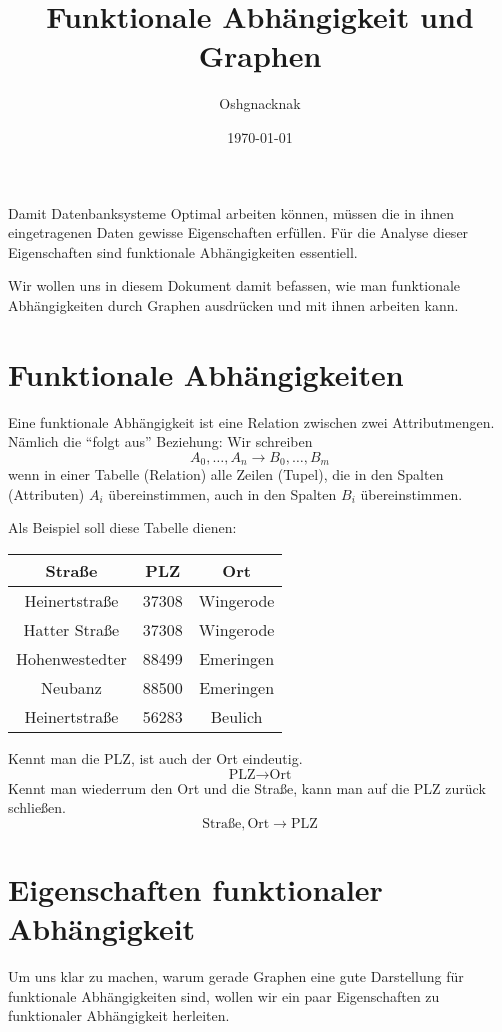 \documentclass[a4paper, ngerman]{article}
\title{Funktionale Abhängigkeit und Graphen}
\author{Oshgnacknak}
\date{\today}
\begin{document}
\maketitle

Damit Datenbanksysteme Optimal arbeiten können,
müssen die in ihnen eingetragenen Daten
gewisse Eigenschaften erfüllen.
Für die Analyse dieser Eigenschaften
sind funktionale Abhängigkeiten essentiell.

Wir wollen uns in diesem Dokument damit befassen,
wie man funktionale Abhängigkeiten durch Graphen ausdrücken
und mit ihnen arbeiten kann.

\section*{Funktionale Abhängigkeiten}
Eine funktionale Abhängigkeit
ist eine Relation zwischen zwei Attributmengen.
Nämlich die \enquote{folgt aus} Beziehung:
Wir schreiben
$$
    A_0, \dots, A_n \to 
    B_0, \dots, B_m
$$
wenn in einer Tabelle (Relation) alle Zeilen (Tupel),
die in den Spalten (Attributen) $A_i$ übereinstimmen,
auch in den Spalten $B_i$ übereinstimmen.

Als Beispiel soll diese Tabelle dienen:
\begin{center}
\begin{tabular}{ c | c | c }
    Straße & PLZ & Ort \\
    \hline
    Heinertstraße & 37308 & Wingerode \\
    Hatter Straße & 37308 & Wingerode \\
    Hohenwestedter & 88499 & Emeringen \\
    Neubanz & 88500 & Emeringen \\
    Heinertstraße & 56283 & Beulich \\
\end{tabular}
\end{center}
Kennt man die PLZ, ist auch der Ort eindeutig.
$$
    \text{PLZ} \to \text{Ort}
$$
Kennt man wiederrum den Ort und die Straße,
kann man auf die PLZ zurück schließen.
$$
    \text{Straße}, \text{Ort} \to \text{PLZ}
$$

\section*{Eigenschaften funktionaler Abhängigkeit}
Um uns klar zu machen,
warum gerade Graphen eine gute Darstellung für
funktionale Abhängigkeiten sind,
wollen wir ein paar Eigenschaften zu
funktionaler Abhängigkeit herleiten.
\end{document}
